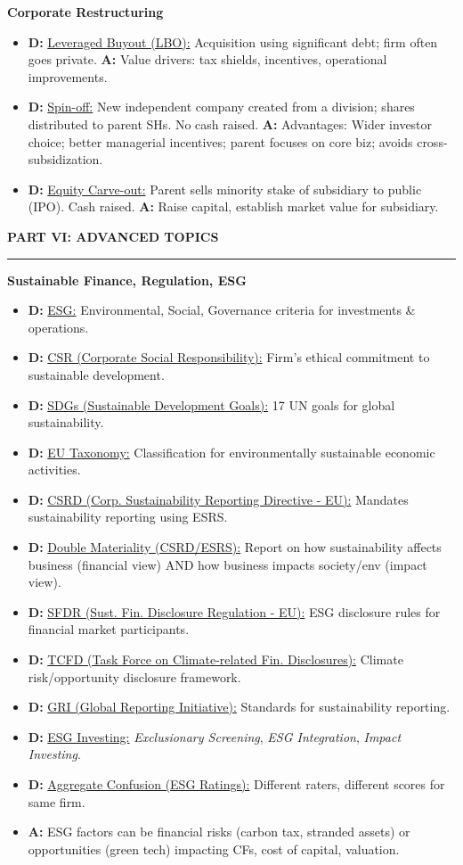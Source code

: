 \documentclass[7pt,landscape]{extarticle} %
\newcommand{\cheatsheetsection}[1]{%
  \vspace{0.25ex plus 0.1ex minus 0.05ex}%
  \noindent\color{SecTitleColor}\textbf{\sffamily\small\MakeUppercase{#1}}%
  \par\vspace{0.02ex}%
  {\color{RuleColor}\hrule height 0.3pt}\par\vspace{0.15ex}%
}
\newcommand{\cheatsheetsubsubsection}[1]{%
  \vspace{0.15ex plus 0.05ex minus 0.05ex}%
  \noindent\textbf{\sffamily\scriptsize #1}%
  \par\vspace{0.05ex}%
}
\newcommand{\D}[1]{\textbf{\textcolor{DefColor}{D:}} \uline{#1}}
\newcommand{\A}[1]{\textbf{\textcolor{AppColor}{A:}} #1}
\begin{document}
\begin{multicols*}{4}
  \cheatsheetsubsubsection{Corporate Restructuring}
  \begin{itemize}
    \item \D{Leveraged Buyout (LBO):} Acquisition using significant debt; firm often goes private. \A{Value drivers: tax shields, incentives, operational improvements.}
    \item \D{Spin-off:} New independent company created from a division; shares distributed to parent SHs. No cash raised.
          \A{Advantages: Wider investor choice; better managerial incentives; parent focuses on core biz; avoids cross-subsidization.}
    \item \D{Equity Carve-out:} Parent sells minority stake of subsidiary to public (IPO). Cash raised. \A{Raise capital, establish market value for subsidiary.}
  \end{itemize}

  \cheatsheetsection{Part VI: Advanced Topics}
  
  \cheatsheetsubsubsection{Sustainable Finance, Regulation, ESG}
  \begin{itemize}
    \item \D{ESG:} Environmental, Social, Governance criteria for investments \& operations.
    \item \D{CSR (Corporate Social Responsibility):} Firm's ethical commitment to sustainable development.
    \item \D{SDGs (Sustainable Development Goals):} 17 UN goals for global sustainability.
    \item \D{EU Taxonomy:} Classification for environmentally sustainable economic activities.
    \item \D{CSRD (Corp. Sustainability Reporting Directive - EU):} Mandates sustainability reporting using ESRS.
    \item \D{Double Materiality (CSRD/ESRS):} Report on how sustainability affects business (financial view) AND how business impacts society/env (impact view).
    \item \D{SFDR (Sust. Fin. Disclosure Regulation - EU):} ESG disclosure rules for financial market participants.
    \item \D{TCFD (Task Force on Climate-related Fin. Disclosures):} Climate risk/opportunity disclosure framework.
    \item \D{GRI (Global Reporting Initiative):} Standards for sustainability reporting.
    \item \D{ESG Investing:} \emph{Exclusionary Screening}, \emph{ESG Integration}, \emph{Impact Investing}.
    \item \D{Aggregate Confusion (ESG Ratings):} Different raters, different scores for same firm.
    \item \A{ESG factors can be financial risks (carbon tax, stranded assets) or opportunities (green tech) impacting CFs, cost of capital, valuation.}
  \end{itemize}
  

\end{multicols*}
\end{document}
